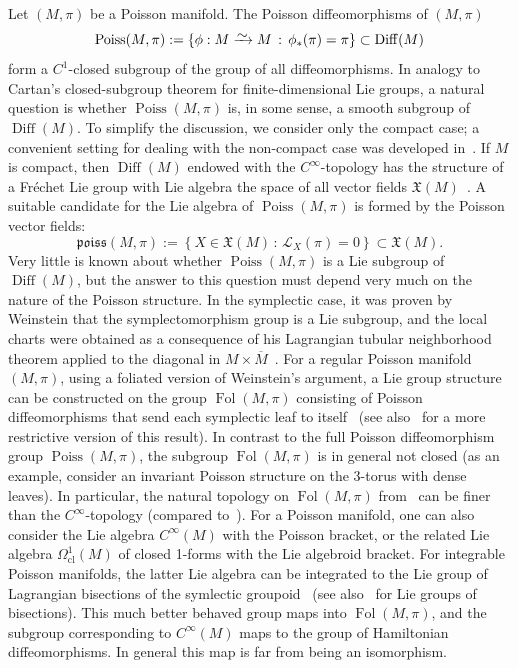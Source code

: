\documentclass[10pt]{amsart}
\theoremstyle{definition}
\newcommand{\diffto}{\xrightarrow{\raisebox{-0.2 em}[0pt][0pt]{\smash{\ensuremath{\sim}}}}}
\newcommand{\fkX}{\mathfrak{X}}
\newcommand{\clL}{\mathcal{L}}
\newcommand{\cl}{\mathrm{cl}}
\newcommand{\fkPoiss}{\mathfrak{poiss}}
\DeclareMathOperator{\Poiss}{Poiss}
\DeclareMathOperator{\Diff}{Diff}
\DeclareMathOperator{\Fol}{Fol}
\begin{document}
Let $(M,\pi)$ be a Poisson manifold. The Poisson diffeomorphisms of $(M,\pi)$
\[
\Poiss(M,\pi):=\left\{\phi:M\diffto M\, : \, \phi_*(\pi)=\pi\right\}\subset \Diff(M)
\]
form a $C^1$-closed subgroup of the group of all diffeomorphisms. In analogy to Cartan's closed-subgroup theorem for finite-dimensional Lie groups, a natural question is whether $\Poiss(M,\pi)$ is, in some sense, a smooth subgroup of $\Diff(M)$. To simplify the discussion, we consider only the compact case; a convenient setting for dealing with the non-compact case was developed in~\cite{Michor}. If $M$ is compact, then $\Diff(M)$ endowed with the $C^{\infty}$-topology has the structure of a Fréchet Lie group with Lie algebra the space of all vector fields $\fkX(M)$~\cite{Hamilton,Milnor}. A suitable candidate for the Lie algebra of $\Poiss(M,\pi)$ is formed by the Poisson vector fields:
\[
\fkPoiss(M,\pi):=\left\{ X\in \fkX(M)\, : \, \clL_X(\pi)=0\right\}\subset \fkX(M).
\]
Very little is known about whether $\Poiss(M,\pi)$ is a Lie subgroup of $\Diff(M)$, but the answer to this question must depend very much on the nature of the Poisson structure. In the symplectic case, it was proven by Weinstein that the symplectomorphism group is a Lie subgroup, and the local charts were obtained as a consequence of his Lagrangian tubular neighborhood theorem applied to the diagonal in $M\times \overline{M}$~\cite{Weinstein}. For a regular Poisson manifold $(M,\pi)$, using a foliated version of Weinstein's argument, a Lie group structure can be constructed on the group $\Fol(M,\pi)$ consisting of Poisson diffeomorphisms that send each symplectic leaf to itself~\cite{Rybicki} (see also~\cite{Banyaga} for a more restrictive version of this result). In contrast to the full Poisson diffeomorphism group $\Poiss(M,\pi)$, the subgroup $\Fol(M,\pi)$ is in general not closed (as an example, consider an invariant Poisson structure on the 3-torus with dense leaves). In particular, the natural topology on $\Fol(M,\pi)$ from~\cite{Rybicki} can be finer than the $C^{\infty}$-topology (compared to~\cite{Banyaga}). For a Poisson manifold, one can also consider the Lie algebra $C^{\infty}(M)$ with the Poisson bracket, or the related Lie algebra $\Omega^1_{\cl}(M)$ of closed 1-forms with the Lie algebroid bracket. For integrable Poisson manifolds, the latter Lie algebra can be integrated to the Lie group of Lagrangian bisections of the symlectic groupoid~\cite{Xu} (see also~\cite{SW} for Lie groups of bisections). This much better behaved group maps into $\Fol(M,\pi)$, and the subgroup corresponding to $C^{\infty}(M)$ maps to the group of Hamiltonian diffeomorphisms. In general this map is far from being an isomorphism.
\end{document}
